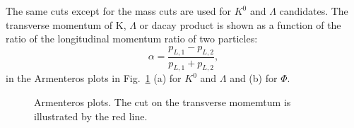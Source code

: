The same cuts except for the mass cuts are used for $K^0$ and $\Lambda$ candidates. The transverse momentum of K, $\Lambda$ or dacay product is shown as a function of the ratio of the longitudinal momentum ratio of two particles:
%
\begin{equation}
  \alpha = \frac{p_{L,1}-p_{L,2}}{p_{L,1}+p_{L,2}},
\end{equation}
%
in the Armenteros plots in Fig.~\ref{pic:Armenteros} (a) for $K^0$ and $\Lambda$ and (b) for $\Phi$.

\begin{figure}[!h]
  \centering
	\caption{Armenteros plots. The cut on the transverse momemtum is illustrated by the red line.}
	\label{pic:Armenteros}
\end{figure}

